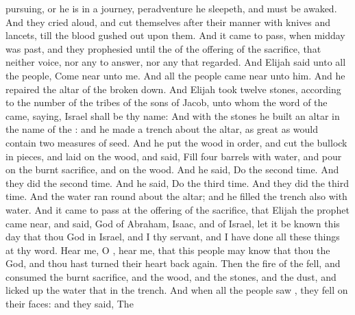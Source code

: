 {pursuing, or he is in a
journey,
{}
peradventure he
sleepeth, and must be
awaked.
And they
cried
aloud, and
cut themselves after their
manner with
knives and
lancets, till the
blood gushed
out upon them.
And it came to pass, when
midday was
past, and they
prophesied until the
{} of the
offering of the
{}
sacrifice, that
{} neither
voice, nor any to
answer, nor any that
regarded.
And
Elijah
said unto all the
people, Come
near unto me. And all the
people came
near unto him. And he
repaired the
altar of the
{}
{} broken
down.
And
Elijah
took
twelve
stones, according to the
number of the
tribes of the
sons of
Jacob, unto whom the
word of the
{} came,
saying,
Israel shall be thy
name:
And with the
stones he
built an
altar in the
name of the
{}: and he
made a
trench
about the
altar, as great as would
contain two
measures of
seed.
And he
put the
wood in
order, and
cut the
bullock in pieces, and
laid
{} on the
wood, and
said,
Fill
four
barrels with
water, and
pour
{} on the burnt
sacrifice, and on the
wood.
And he
said, Do
{} the second
time. And they did
{} the second
time. And he
said, Do
{} the third
time. And they did
{} the third
time.
And the
water
ran round
about the
altar; and he
filled the
trench also with
water.
And it came to pass at
{} the
offering of the
{}
sacrifice, that
Elijah the
prophet came
near, and
said,
{}
God of
Abraham,
Isaac, and of
Israel, let it be
known this
day that thou
{}
God in
Israel, and
{} I
{} thy
servant, and
{} I have
done all these things at thy
word.
Hear me, O
{},
hear me, that this
people may
know that thou
{} the
{}
God, and
{} thou hast
turned their
heart
back
again.
Then the
fire of the
{}
fell, and
consumed the burnt
sacrifice, and the
wood, and the
stones, and the
dust, and licked
up the
water that
{} in the
trench.
And when all the
people
saw
{}, they
fell on their
faces: and they
said, The
{\ND{
}}}
